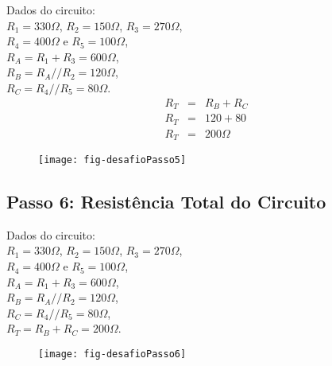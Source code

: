 \begin{minipage}{\linewidth}
  \centering
  \begin{minipage}{0.45\linewidth}
    Dados do circuito: \\
                $R_1 = 330\Omega$,
                $R_2 = 150\Omega$,
                $R_3 = 270\Omega$, \\
                $R_4 = 400\Omega$ e
                $R_5 = 100\Omega$,\\
                $R_A = R_1 + R_3 = 600\Omega$, \\
                $R_B = R_A // R_2 = 120\Omega$, \\
                $R_C = R_4 // R_5 = 80\Omega$.
        \begin{eqnarray}
          R_T & = & R_B + R_C \nonumber\\
          R_T & = & 120 + 80 \nonumber\\
          R_T & = & 200\Omega \nonumber
        \end{eqnarray}

  \end{minipage}
  \hspace{0.05\linewidth}
  \begin{minipage}{0.45\linewidth}
    \begin{figure}[H]
      \centering
      \texttt{[image: fig-desafioPasso5]}
    \end{figure}
  \end{minipage}
\end{minipage}



\subsection{Passo 6: Resistência Total do Circuito}

\begin{minipage}{\linewidth}
  \centering
  \begin{minipage}{0.45\linewidth}
    Dados do circuito: \\
                $R_1 = 330\Omega$,
                $R_2 = 150\Omega$,
                $R_3 = 270\Omega$, \\
                $R_4 = 400\Omega$ e
                $R_5 = 100\Omega$,\\
                $R_A = R_1 + R_3 = 600\Omega$, \\
                $R_B = R_A // R_2 = 120\Omega$, \\
                $R_C = R_4 // R_5 = 80\Omega$, \\
                $R_T = R_B + R_C = 200\Omega$.
  \end{minipage}
  \hspace{0.05\linewidth}
  \begin{minipage}{0.45\linewidth}
    \begin{figure}[H]
      \centering
      \texttt{[image: fig-desafioPasso6]}
    \end{figure}
  \end{minipage}
\end{minipage}





